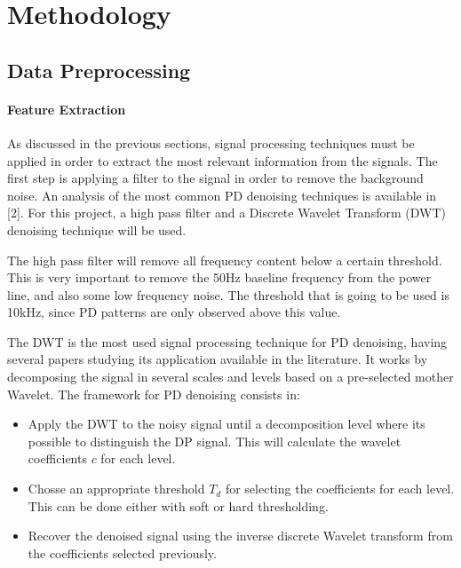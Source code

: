 \documentclass[11pt]{article}
\providecommand{\tightlist}{%
      \setlength{\itemsep}{0pt}\setlength{\parskip}{0pt}}
\begin{document}
    \hypertarget{iii.-methodology}{%
\section{Methodology}\label{iii.-methodology}}

\hypertarget{data-preprocessing}{%
\subsection{Data Preprocessing}\label{data-preprocessing}}

\hypertarget{feature-extraction}{%
\paragraph{Feature Extraction}\label{feature-extraction}}

As discussed in the previous sections, signal processing techniques must
be applied in order to extract the most relevant information from the
signals. The first step is applying a filter to the signal in order to
remove the background noise. An analysis of the most common PD denoising
techniques is available in {[}2{]}. For this project, a high pass filter
and a Discrete Wavelet Transform (DWT) denoising technique will be used.

The high pass filter will remove all frequency content below a certain
threshold. This is very important to remove the 50Hz baseline frequency
from the power line, and also some low frequency noise. The threshold
that is going to be used is 10kHz, since PD patterns are only observed
above this value.

The DWT is the most used signal processing technique for PD denoising,
having several papers studying its application available in the
literature. It works by decomposing the signal in several scales and
levels based on a pre-selected mother Wavelet. The framework for PD
denoising consists in:

\begin{itemize}
\tightlist
\item
  Apply the DWT to the noisy signal until a decomposition level where
  its possible to distinguish the DP signal. This will calculate the
  wavelet coefficients \(c\) for each level.
\item
  Chosse an appropriate threshold \(T_{d}\) for selecting the
  coefficients for each level. This can be done either with soft or hard
  thresholding.
\item
  Recover the denoised signal using the inverse discrete Wavelet
  transform from the coefficients selected previously.
\end{itemize}
\end{document}
